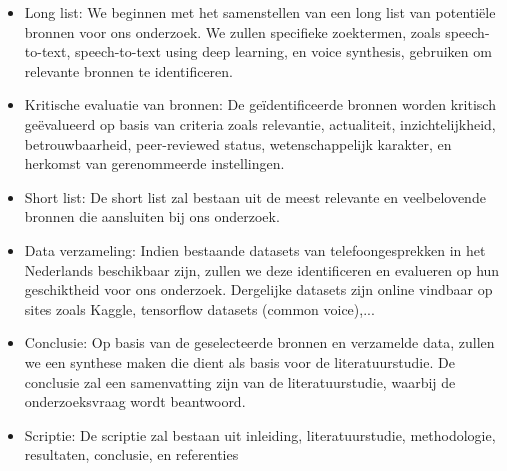 \begin{itemize}
    \item Long list: We beginnen met het samenstellen van een long list van potentiële bronnen voor ons onderzoek. We zullen specifieke zoektermen, zoals speech-to-text, speech-to-text using deep learning, en voice synthesis, gebruiken om relevante bronnen te identificeren.
    \item Kritische evaluatie van bronnen: De geïdentificeerde bronnen worden kritisch geëvalueerd op basis van criteria zoals relevantie, actualiteit, inzichtelijkheid, betrouwbaarheid, peer-reviewed status, wetenschappelijk karakter, en herkomst van gerenommeerde instellingen.
    \item Short list: De short list zal bestaan uit de meest relevante en veelbelovende bronnen die aansluiten bij ons onderzoek.
    \item Data verzameling: Indien bestaande datasets van telefoongesprekken in het Nederlands beschikbaar zijn, zullen we deze identificeren en evalueren op hun geschiktheid voor ons onderzoek. Dergelijke datasets zijn online vindbaar op sites zoals Kaggle, tensorflow datasets (common voice),...
    \item Conclusie: Op basis van de geselecteerde bronnen en verzamelde data, zullen we een synthese maken die dient als basis voor de literatuurstudie. De conclusie zal een samenvatting zijn van de literatuurstudie, waarbij de onderzoeksvraag wordt beantwoord.
    \item Scriptie: De scriptie zal bestaan uit inleiding, literatuurstudie, methodologie, resultaten, conclusie, en referenties
\end{itemize}

